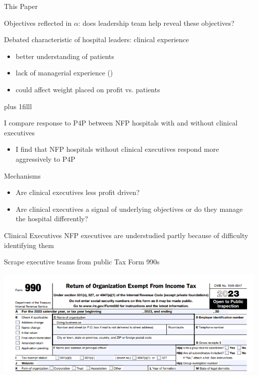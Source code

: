 \documentclass[notes,11pt, aspectratio=169]{beamer}
\newcommand{\btVFill}{\vskip0pt plus 1filll}
\newenvironment{wideitemize}{\itemize\addtolength{\itemsep}{10pt}}{\enditemize}
\begin{document}
\begin{frame}{This Paper}
\vspace{5mm}
\begin{wideitemize}
    \item Objectives reflected in $\alpha$: does leadership team help reveal these objectives?
    \item Debated characteristic of hospital leaders: clinical experience
    \begin{itemize}
        \item better understanding of patients
        \item lack of managerial experience (\cite{otero2022managers})
        \item could affect weight placed on profit vs. patients
    \end{itemize}
\end{wideitemize}

\btVFill\pause

\begin{block}{}
    I compare response to P4P between NFP hospitals with and without clinical executives
    \begin{itemize}
        \item I find that NFP hospitals without clinical executives respond more aggressively to P4P
    \end{itemize}\pause
\end{block}
\begin{block}{Mechanisms}
    \begin{itemize}
        \item Are clinical executives less profit driven?
        \item Are clinical executives a signal of underlying objectives or do they manage the hospital differently? 
    \end{itemize}
\end{block}
  
\end{frame}

\begin{frame}{Clinical Executives}
NFP executives are understudied partly because of difficulty identifying them

\vspace{4mm}

Scrape executive teams from public Tax Form 990s 

\vspace{4mm}

    \centering
    \includegraphics[width=.8\textwidth]{Graphics/990_snip_frontpage.PNG}
\end{frame}
\end{document}
